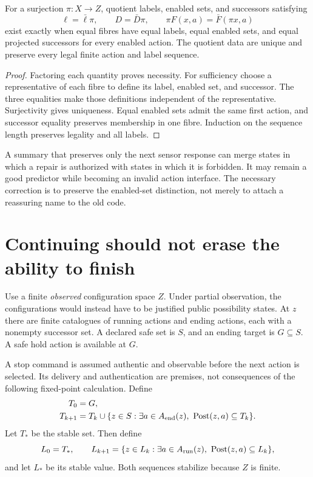 \begin{theorem}\label{r:governance}
For a surjection $\pi:X\to Z$, quotient labels, enabled sets, and successors satisfying
\[
\ell=\bar\ell\pi,\qquad D=\bar D\pi,\qquad
\pi F(x,a)=\bar F(\pi x,a)
\]
exist exactly when equal fibres have equal labels, equal enabled sets, and equal projected successors for every enabled action. The quotient data are unique and preserve every legal finite action and label sequence.
\end{theorem}
\begin{proof}
Factoring each quantity proves necessity. For sufficiency choose a representative of each fibre to define its label, enabled set, and successor. The three equalities make those definitions independent of the representative. Surjectivity gives uniqueness. Equal enabled sets admit the same first action, and successor equality preserves membership in one fibre. Induction on the sequence length preserves legality and all labels.
\end{proof}

A summary that preserves only the next sensor response can merge states in which a repair is authorized with states in which it is forbidden. It may remain a good predictor while becoming an invalid action interface. The necessary correction is to preserve the enabled-set distinction, not merely to attach a reassuring name to the old code.

\section{Continuing should not erase the ability to finish}
Use a finite \emph{observed} configuration space $Z$. Under partial observation, the configurations would instead have to be justified public possibility states. At $z$ there are finite catalogues of running actions and ending actions, each with a nonempty successor set. A declared safe set is $S$, and an ending target is $G\subseteq S$. A safe hold action is available at $G$.

A stop command is assumed authentic and observable before the next action is selected. Its delivery and authentication are premises, not consequences of the following fixed-point calculation. Define
\begin{align*}
T_0&=G,\\
T_{k+1}&=T_k\cup\{z\in S:\exists a\in A_{\rm end}(z),\ \operatorname{Post}(z,a)\subseteq T_k\}.
\end{align*}
Let $T_*$ be the stable set. Then define
\[
L_0=T_*,\qquad
L_{k+1}=\{z\in L_k:\exists a\in A_{\rm run}(z),\ \operatorname{Post}(z,a)\subseteq L_k\},
\]
and let $L_*$ be its stable value. Both sequences stabilize because $Z$ is finite.

